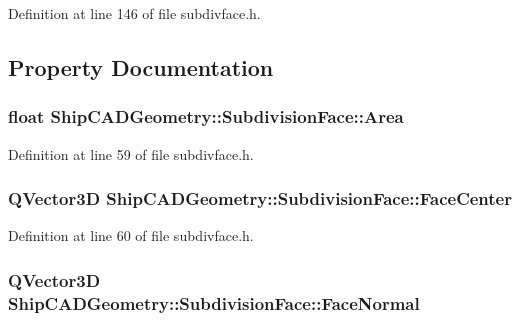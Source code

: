 Definition at line 146 of file subdivface.\-h.



\subsection{Property Documentation}
\hypertarget{classShipCADGeometry_1_1SubdivisionFace_a19d38604a7e9f14c927c59616bb3b8a5}{
\subsubsection[{Area}]{\setlength{\rightskip}{0pt plus 5cm}float Ship\-C\-A\-D\-Geometry\-::\-Subdivision\-Face\-::\-Area\hspace{0.3cm}{\ttfamily [read]}}}\label{classShipCADGeometry_1_1SubdivisionFace_a19d38604a7e9f14c927c59616bb3b8a5}


Definition at line 59 of file subdivface.\-h.

\hypertarget{classShipCADGeometry_1_1SubdivisionFace_a4ceab979e8faacf6c8c10420fb720080}{
\subsubsection[{Face\-Center}]{\setlength{\rightskip}{0pt plus 5cm}Q\-Vector3\-D Ship\-C\-A\-D\-Geometry\-::\-Subdivision\-Face\-::\-Face\-Center\hspace{0.3cm}{\ttfamily [read]}}}\label{classShipCADGeometry_1_1SubdivisionFace_a4ceab979e8faacf6c8c10420fb720080}


Definition at line 60 of file subdivface.\-h.

\hypertarget{classShipCADGeometry_1_1SubdivisionFace_a4d9b9545d88ed7c470eadd42172c7530}{
\subsubsection[{Face\-Normal}]{\setlength{\rightskip}{0pt plus 5cm}Q\-Vector3\-D Ship\-C\-A\-D\-Geometry\-::\-Subdivision\-Face\-::\-Face\-Normal\hspace{0.3cm}{\ttfamily [read]}}}\label{classShipCADGeometry_1_1SubdivisionFace_a4d9b9545d88ed7c470eadd42172c7530}


